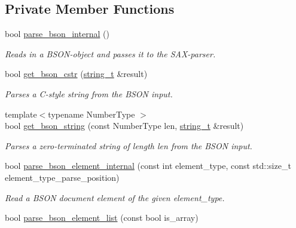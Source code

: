 \subsection*{Private Member Functions}
\begin{DoxyCompactItemize}
\item 
bool \hyperlink{classnlohmann_1_1detail_1_1binary__reader_a950f6ef800421fef9499af1c4c8918f5}{parse\+\_\+bson\+\_\+internal} ()
\begin{DoxyCompactList}\small\item\em Reads in a B\+S\+O\+N-\/object and passes it to the S\+A\+X-\/parser. \end{DoxyCompactList}\item 
bool \hyperlink{classnlohmann_1_1detail_1_1binary__reader_a075d20a35a09496c504c7dff135823ed}{get\+\_\+bson\+\_\+cstr} (\hyperlink{classnlohmann_1_1detail_1_1binary__reader_aa0b9729917ca7ee6ed01e3792341316e}{string\+\_\+t} \&result)
\begin{DoxyCompactList}\small\item\em Parses a C-\/style string from the B\+S\+ON input. \end{DoxyCompactList}\item 
{\footnotesize template$<$typename Number\+Type $>$ }\\bool \hyperlink{classnlohmann_1_1detail_1_1binary__reader_a46bf64d7193eea97cac6dd4d4abdb4fa}{get\+\_\+bson\+\_\+string} (const Number\+Type len, \hyperlink{classnlohmann_1_1detail_1_1binary__reader_aa0b9729917ca7ee6ed01e3792341316e}{string\+\_\+t} \&result)
\begin{DoxyCompactList}\small\item\em Parses a zero-\/terminated string of length {\itshape len} from the B\+S\+ON input. \end{DoxyCompactList}\item 
bool \hyperlink{classnlohmann_1_1detail_1_1binary__reader_a2fdd24de008063e7fef896327daeffa1}{parse\+\_\+bson\+\_\+element\+\_\+internal} (const int element\+\_\+type, const std\+::size\+\_\+t element\+\_\+type\+\_\+parse\+\_\+position)
\begin{DoxyCompactList}\small\item\em Read a B\+S\+ON document element of the given {\itshape element\+\_\+type}. \end{DoxyCompactList}\item 
bool \hyperlink{classnlohmann_1_1detail_1_1binary__reader_a7316619ace9efdc718d04e7b8f807e1e}{parse\+\_\+bson\+\_\+element\+\_\+list} (const bool is\+\_\+array)

\end{DoxyCompactItemize}
